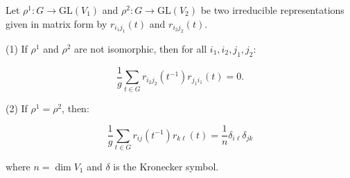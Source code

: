 Let $\rho^1: G \to \text{GL}(V_1)$ and $\rho^2: G \to \text{GL}(V_2)$ be two irreducible representations given in matrix form by $r_{i_1 j_1}(t)$ and $r_{i_2 j_2}(t)$.

(1) If $\rho^1$ and $\rho^2$ are not isomorphic, then for all $i_1, i_2, j_1, j_2$:

$$\frac{1}{g} \sum_{t \in G} r_{i_2 j_2}(t^{-1}) r_{j_1 i_1}(t) = 0.$$

(2) If $\rho^1 = \rho^2$, then:

$$\frac{1}{g} \sum_{t \in G} r_{i j}(t^{-1}) r_{k \ell}(t) = \frac{1}{n} \delta_{i \ell} \delta_{j k}$$

where $n = \dim V_1$ and $\delta$ is the Kronecker symbol.
